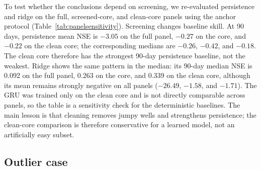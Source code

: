 \documentclass[preprint,12pt]{elsarticle}
\begin{document}
To test whether the conclusions depend on screening, we re-evaluated
persistence and ridge on the full, screened-core, and clean-core panels using
the anchor protocol (Table~\ref{tab:panelsensitivity}). Screening changes
baseline skill. At 90 days, persistence mean NSE is $-3.05$ on the full panel,
$-0.27$ on the core, and $-0.22$ on the clean core; the corresponding medians
are $-0.26$, $-0.42$, and $-0.18$. The clean core therefore has the strongest
90-day persistence baseline, not the weakest. Ridge shows the same pattern in the
median: its 90-day median NSE is 0.092 on the full panel, 0.263 on the core,
and 0.339 on the clean core, although its mean remains strongly negative on
all panels ($-26.49$, $-1.58$, and $-1.71$). The GRU was trained only on the
clean core and is not directly comparable across panels, so the table is a
sensitivity check for the deterministic baselines. The main lesson is that
cleaning removes jumpy wells and strengthens persistence; the clean-core
comparison is therefore conservative for a learned model, not an artificially
easy subset.

\begin{table}[t]
\centering
\caption{Cross-panel sensitivity of deterministic baselines on the common
anchor protocol. Each cell is 30 d / 90 d. $N$ is the number of wells with
sufficient training and test anchors; the full panel excludes 33/34 wells with
fewer than 30 test anchors or insufficient training support. The GRU is trained
only on the clean core and is not compared across panels.}
\label{tab:panelsensitivity}
\end{table}

\subsection{Outlier case}
\end{document}
